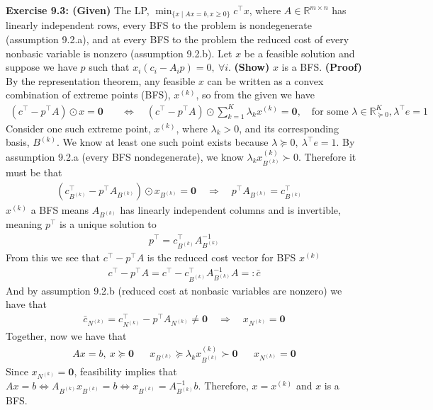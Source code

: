 \documentclass[11pt]{exam}
\begin{document}
\begin{questions}
    

    \question \textbf{Exercise 9.3: (Given)} The LP, $\min_{\{x\mid Ax=b, x\geq0\}}c^\top x$, where $A\in \mathbb R^{m\times n}$ has linearly independent rows, every BFS to the problem is nondegenerate (assumption 9.2.a), and at every BFS to the problem the reduced cost of every nonbasic variable is nonzero (assumption 9.2.b). Let $x$ be a feasible solution and suppose we have $p$ such that $x_i(c_i - A_ip) = 0,\ \forall i$. \textbf{(Show)} $x$ is a BFS.
    \newline \textbf{(Proof)} By the representation theorem, any feasible $x$ can be written as a convex combination of extreme points (BFS), $x^{(k)}$, so from the given we have
    \begin{align*}
        \left(c^\top - p^\top A\right) \odot x = \mathbf{0}\quad&\iff\quad (c^\top - p^\top A) \odot\sum_{k=1}^K \lambda_k x^{(k)}  = \mathbf{0}
        ,\quad\text{for some } \lambda\in\mathbb R_{\succeq0}^K, \lambda^\top e = 1
        \tag{$\odot$ is elementwise product}
    \end{align*}
    Consider one such extreme point, $x^{(k)}$, where $\lambda_k > 0$, and its corresponding basis, $B^{(k)}$. We know at least one such point exists because $\lambda \succeq 0,\ \lambda^\top e = 1$.
    By assumption 9.2.a (every BFS nondegenerate), we know $\lambda_k x^{(k)}_{B^{(k)}} \succ 0$. Therefore it must be that
    \begin{align*}
        \left(c^\top_{B^{(k)}} - p^\top A_{B^{(k)}}\right) \odot x_{B^{(k)}} = \mathbf{0} \quad\Longrightarrow\quad p^\top A_{B^{(k)}} = c_{B^{(k)}}^\top \quad
    \end{align*}
    $x^{(k)}$ a BFS means $A_{B^{(k)}}$ has linearly independent columns and is invertible, meaning $p^\top$ is a unique solution to
    \begin{align*}
        p^\top = c_{B^{(k)}}^\top A_{B^{(k)}}^{-1}
    \end{align*}
    From this we see that $c^\top - p^\top A$ is the reduced cost vector for BFS $x^{(k)}$
    \begin{align*}
        c^\top - p^\top A = c^\top - c_{B^{(k)}}^\top A_{B^{(k)}}^{-1} A =: \bar c
    \end{align*}
    And by assumption 9.2.b (reduced cost at nonbasic variables are nonzero) we have that 
    \begin{align*}
        \bar c_{N^{(k)}} = c^\top_{N^{(k)}} - p^\top A_{N^{(k)}} \neq \mathbf{0} \quad \Longrightarrow\quad x_{N^{(k)}} = \mathbf{0}
    \end{align*}
    Together, now we have that
    \begin{align*}
        Ax=b,\ x \succeq \mathbf{0} && 
        x_{B^{(k)}} \succeq \lambda_k x^{(k)}_{B^{(k)}} \succ \mathbf{0} &&
        x_{N^{(k)}} = \mathbf{0}
    \end{align*}
    Since $x_{N^{(k)}} = \mathbf{0}$, feasibility implies that $Ax = b \iff A_{B^{(k)}}x_{B^{(k)}} = b \iff x_{B^{(k)}} = A^{-1}_{B^{(k)}}b$. Therefore, $x = x^{(k)}$ and $x$ is a BFS.
    
\end{questions}
\end{document}
